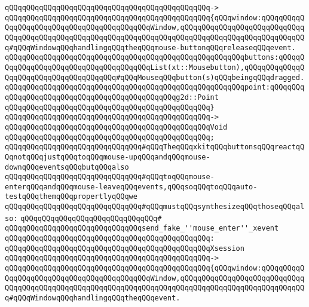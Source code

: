 \verb|qQQqqQQqqQQqqQQqqQQqqQQqqQQqqQQqqQQqqQQqqQQqqQQq->|\newline
\verb|qQQqqQQqqQQqqQQqqQQqqQQqqQQqqQQqqQQqqQQqqQQqqQQq{qQQqwindow:qQQqqQQqqQQqqQQqqQQqqQQqqQQqqQQqqQQqqQQqqQQqWindow,qQQqqQQqqQQqqQQqqQQqqQQqqQQqqQQqqQQqqQQqqQQqqQQqqQQqqQQqqQQqqQQqqQQqqQQqqQQqqQQqqQQqqQQqqQQqqQQqqQQq#qQQqWindowqQQqhandlingqQQqtheqQQqmouse-buttonqQQqreleaseqQQqevent.|\newline
\verb|qQQqqQQqqQQqqQQqqQQqqQQqqQQqqQQqqQQqqQQqqQQqqQQqqQQqqQQqbuttons:qQQqqQQqqQQqqQQqqQQqqQQqqQQqqQQqqQQqqQQqList(xt::Mousebutton),qQQqqQQqqQQqqQQqqQQqqQQqqQQqqQQqqQQqqQQq#qQQqMouseqQQqbutton(s)qQQqbeingqQQqdragged.|\newline
\verb|qQQqqQQqqQQqqQQqqQQqqQQqqQQqqQQqqQQqqQQqqQQqqQQqqQQqqQQqpoint:qQQqqQQqqQQqqQQqqQQqqQQqqQQqqQQqqQQqqQQqqQQqqQQqg2d::Point|\newline
\verb|qQQqqQQqqQQqqQQqqQQqqQQqqQQqqQQqqQQqqQQqqQQqqQQq}|\newline
\verb|qQQqqQQqqQQqqQQqqQQqqQQqqQQqqQQqqQQqqQQqqQQqqQQq->|\newline
\verb|qQQqqQQqqQQqqQQqqQQqqQQqqQQqqQQqqQQqqQQqqQQqqQQqVoid|\newline
\verb|qQQqqQQqqQQqqQQqqQQqqQQqqQQqqQQqqQQqqQQqqQQqqQQq;|\newline
\newline
\verb|qQQqqQQqqQQqqQQqqQQqqQQqqQQqqQQq#qQQqTheqQQqxkitqQQqbuttonsqQQqreactqQQqnotqQQqjustqQQqtoqQQqmouse-upqQQqandqQQqmouse-downqQQqeventsqQQqbutqQQqalso|\newline
\verb|qQQqqQQqqQQqqQQqqQQqqQQqqQQqqQQq#qQQqtoqQQqmouse-enterqQQqandqQQqmouse-leaveqQQqevents,qQQqsoqQQqtoqQQqauto-testqQQqthemqQQqpropertlyqQQqwe|\newline
\verb|qQQqqQQqqQQqqQQqqQQqqQQqqQQqqQQq#qQQqmustqQQqsynthesizeqQQqthoseqQQqalso:|\newline
\verb|qQQqqQQqqQQqqQQqqQQqqQQqqQQqqQQq#|\newline
\verb|qQQqqQQqqQQqqQQqqQQqqQQqqQQqqQQqsend_fake_''mouse_enter''_xevent|\newline
\verb|qQQqqQQqqQQqqQQqqQQqqQQqqQQqqQQqqQQqqQQqqQQqqQQq:|\newline
\verb|qQQqqQQqqQQqqQQqqQQqqQQqqQQqqQQqqQQqqQQqqQQqqQQqXsession|\newline
\verb|qQQqqQQqqQQqqQQqqQQqqQQqqQQqqQQqqQQqqQQqqQQqqQQq->|\newline
\verb|qQQqqQQqqQQqqQQqqQQqqQQqqQQqqQQqqQQqqQQqqQQqqQQq{qQQqwindow:qQQqqQQqqQQqqQQqqQQqqQQqqQQqqQQqqQQqqQQqqQQqWindow,qQQqqQQqqQQqqQQqqQQqqQQqqQQqqQQqqQQqqQQqqQQqqQQqqQQqqQQqqQQqqQQqqQQqqQQqqQQqqQQqqQQqqQQqqQQqqQQqqQQq#qQQqWindowqQQqhandlingqQQqtheqQQqevent.|\newline
